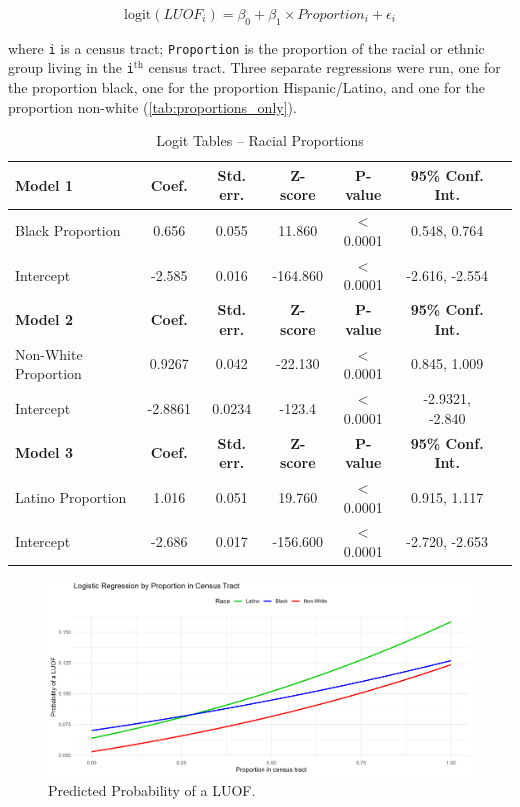 \documentclass[12pt]{article}
\begin{document}
\begin{equation}
\text{logit}(LUOF_{i})=\beta_{0} + \beta_{1} \times Proportion_{i} + \epsilon_{i}
\end{equation}

\noindent{}where \texttt{i} is a census tract; \texttt{Proportion} is the proportion of the racial or ethnic group living in the \texttt{i}$^\text{th}$ census tract. Three separate regressions were run, one for the proportion black, one for the proportion Hispanic/Latino, and one for the proportion non-white (\autoref{tab:proportions_only}).

\begin{table}[ht]
\centering
\begin{tabular}{lcccccc}
\toprule
\textbf{Model 1} & \textbf{Coef.} & \textbf{Std. err.} & \textbf{Z-score} & \textbf{P-value} & \textbf{95\% Conf. Int.} \\
\midrule
Black Proportion & 0.656 & 0.055 & 11.860 & $<$0.0001 & 0.548, 0.764 \\
Intercept & -2.585 & 0.016 & -164.860 & $<$0.0001 & -2.616, -2.554 \\
\midrule
\textbf{Model 2} & \textbf{Coef.} & \textbf{Std. err.} & \textbf{Z-score} & \textbf{P-value} & \textbf{95\% Conf. Int.} \\
\midrule
Non-White Proportion & 0.9267 & 0.042 & -22.130 & $<$0.0001 & 0.845, 1.009 \\
Intercept & -2.8861 & 0.0234 & -123.4 & $<$0.0001 & -2.9321, -2.840 \\
\midrule
\textbf{Model 3} & \textbf{Coef.} & \textbf{Std. err.} & \textbf{Z-score} & \textbf{P-value} & \textbf{95\% Conf. Int.} \\
\midrule
Latino Proportion & 1.016 & 0.051 & 19.760 & $<$0.0001 & 0.915, 1.117 \\
Intercept & -2.686 & 0.017 & -156.600 & $<$0.0001 & -2.720, -2.653 \\
\bottomrule
\end{tabular}
\caption{Logit Tables -- Racial Proportions}
\label{tab:proportions_only}
\end{table}

\begin{figure}[H]
  \centering %
  \includegraphics[width=\linewidth]{images/race_proportions_logit}
  \captionsetup{justification=centering, singlelinecheck=false, margin=2cm}
  \caption[Predicted Probability of a LUOF (Race Only)]{Predicted Probability of a LUOF.}
  \label{fig:logit_race_propor}
\end{figure}
\end{document}
